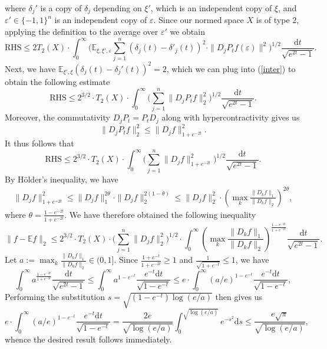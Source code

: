    where $\delta_j'$ is a copy of $\delta_j$ depending on $\xi'$, which is an independent copy of $\xi$, and $\varepsilon' \in \{-1,1\}^n$ is an independent copy of $\varepsilon$.  Since our normed space $X$ is of type 2, applying the definition to the average over $\varepsilon'$ we obtain
   \begin{equation}
       \text{RHS} \leq 2T_{2}(X)\cdot\int_0^\infty \Big(\mathbb{E}_{\xi,\xi',\varepsilon} \sum_{j=1}^n (\delta_j(t)-\delta'_j(t))^2 \cdot \|D_j P_tf(\varepsilon)\|^2 \Big)^{1/2} \frac{\mathrm{d}t}{\sqrt{e^{2t}-1}}. \label{inter}
   \end{equation}
   Next, we have $\mathbb{E}_{\xi',\xi}(\delta_j(t) - \delta_j'(t))^2 = 2$,  which we can plug into (\ref{inter}) to obtain the following estimate
   \[\text{RHS} \leq 2^{3/2}\cdot T_{2}(X) \cdot\int_0^\infty \Big( \sum_{j=1}^n \|D_j P_tf\|^{2}_{2} \Big)^{1/2} \frac{\mathrm{d}t}{\sqrt{e^{2t}-1}}.\]
   Moreover, the commutativity $D_jP_t = P_tD_j$ along with hypercontractivity gives us
   \[\|D_j P_tf\|^{2}_{2} \leq \|D_j f\|_{1+e^{-2t}}^2.\]
   It thus follows that
   \[\text{RHS} \leq 2^{3/2}\cdot T_{2}(X) \cdot\int_0^\infty \Big( \sum_{j=1}^n \|D_j f\|_{1+e^{-2t}}^2 \Big)^{1/2} \frac{\mathrm{d}t}{\sqrt{e^{2t}-1}}.\]
   By H{\"o}lder's inequality, we have 
   \begin{align}\label{hohe}
    \|D_j f\|_{1+e^{-2t}}^2 \leq \|D_j f\|_{1}^{2\theta}\cdot \|D_j f\|_{2}^{2(1-\theta)} \leq \|D_j f\|_{2}^2 \cdot \left(\max_k\frac{\|D_k f\|_{1}}{\|D_k f\|_{2}}\right)^{2\theta},
    \end{align}
    where $\theta = \frac{1-e^{-2t}}{1+e^{-2t}}.$
    We have therefore obtained the following inequality
    \begin{equation}
        \|f-\mathbb{E}f\|_2\leq 2^{3/2}\cdot T_{2}(X) \cdot  \Big( \sum\limits_{j=1}^n\|D_jf\|_2^2\Big)^{1/2}\cdot \int_0^\infty \left(\max_k\frac{\|D_k f\|_1}{\|D_k f\|_2}\right)^{\frac{1-e^{-2t}}{1+e^{-2t}}}\frac{\mathrm{d}t}{\sqrt{e^{2t}-1}}. \label{pre-final}
    \end{equation}
    Let $a := \max_k\frac{\|D_k f\|_1}{\|D_k f\|_2} \in (0,1]$.  Since $\frac{1+e^{-t}}{1+e^{-2t}} \geq 1$ and $\frac{1}{\sqrt{1+e^{-t}}}\leq 1$, we have
    \[\int_0^\infty a^{\frac{1-e^{-2t}}{1+e^{-2t}}}\frac{\mathrm{d}t}{\sqrt{e^{2t}-1}} \leq \int_0^\infty a^{1-e^{-t}} \frac{e^{-t}\mathrm{d}t}{\sqrt{1-e^{-t}}} \leq e\cdot\int_0^\infty (a/e)^{1-e^{-t}} \frac{e^{-t}\mathrm{d}t}{\sqrt{1-e^{-t}}},\]
    Performing the substitution $s = \sqrt{(1-e^{-t})\log(e/a)}$ then gives us
    \[e\cdot\int_0^\infty (a/e)^{1-e^{-t}} \frac{e^{-t}\mathrm{d}t}{\sqrt{1-e^{-t}}} = \frac{2e}{\sqrt{\log(e/a)}}\int_0^{\sqrt{\log(e/a)}}e^{-s^2}\mathrm{d}s \leq \frac{e\sqrt{\pi}}{\sqrt{\log(e/a)}},\]
    whence the desired result follows immediately.
    \hfill \qedsymbol
